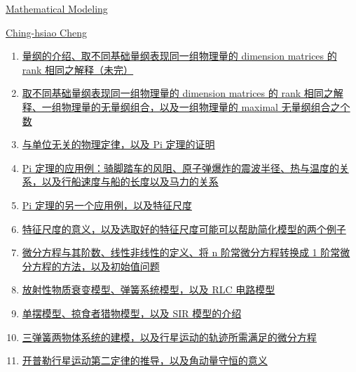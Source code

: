 \documentclass[11pt]{article}
\begin{document}
\kaishu 
\setcounter{section}{0}
\begin{center}
	{\LARGE  \href{http://www.math.ncu.edu.tw/~cchsiao/Course/Math_Modeling_111/index.html}{Mathematical Modeling}}
		
		{\large \href{http://www.math.ncu.edu.tw/~cchsiao/}{Ching-hsiao Cheng}}
\end{center}

\setcounter{page}{1}

\vspace{-0.5cm}

\begin{enumerate}
	\item \href{https://mp.weixin.qq.com/s/3W4bEC8yV1epd9AYmX7q8A}{量纲的介绍、取不同基础量纲表现同一组物理量的 dimension matrices 的 rank 相同之解释（未完）}	%
	\item \href{https://mp.weixin.qq.com/s/DPIQg4YrQBv-gBO6Dw1HFw}{取不同基础量纲表现同一组物理量的 dimension matrices 的 rank 相同之解释、一组物理量的无量纲组合，以及一组物理量的 maximal 无量纲组合之个数}	%
	\item \href{https://mp.weixin.qq.com/s/-b4DRopoIeGrAXnTGZJ4Hg}{与单位无关的物理定律，以及 Pi 定理的证明}	%
	\item \href{https://mp.weixin.qq.com/s/3YoxFHUWZ6hJmGLu1DlZJQ}{Pi 定理的应用例：骑脚踏车的风阻、原子弹爆炸的震波半径、热与温度的关系，以及行船速度与船的长度以及马力的关系}	%
	\item \href{https://mp.weixin.qq.com/s/5eYyUggrFrEPX4P7n0YRLQ}{Pi 定理的另一个应用例，以及特征尺度}	%
	\item \href{https://mp.weixin.qq.com/s/5-gPsS6QtXFEoxPtI16HKw}{特征尺度的意义，以及选取好的特征尺度可能可以帮助简化模型的两个例子}	%
	\item \href{https://mp.weixin.qq.com/s/IIsnJPV9QgHhZh7HLlzcVw}{微分方程与其阶数、线性非线性的定义、将 n 阶常微分方程转换成 1 阶常微分方程的方法，以及初始值问题}	%
	\item \href{https://mp.weixin.qq.com/s/ickSHe2vlUpYkZMzM8iooA}{放射性物质衰变模型、弹簧系统模型，以及 RLC 电路模型}	%
	\item \href{https://mp.weixin.qq.com/s/9DpCUD7vxpJ5MsV6mrrKUQ}{单摆模型、掠食者猎物模型，以及 SIR 模型的介绍}	%
	\item \href{https://mp.weixin.qq.com/s/J-ponUncShp8fRO9EcUkYg}{三弹簧两物体系统的建模，以及行星运动的轨迹所需满足的微分方程}	%
	\item \href{https://mp.weixin.qq.com/s/4q018oPog0fv6AsA8tEXpA}{开普勒行星运动第二定律的推导，以及角动量守恒的意义}	%

\end{enumerate}
\end{document}
